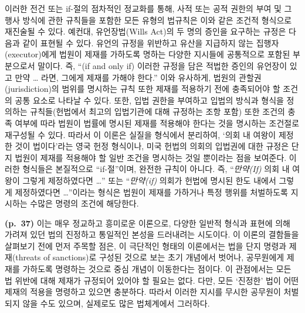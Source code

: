 \documentclass[12pt, oneside]{book}  %
\begin{document}
이러한 전건 또는 if-절의 점차적인 정교화를 통해, 사적 또는 공적 권한의
부여 및 그 행사 방식에 관한 규칙들을 포함한 모든 유형의 법규칙은 이와
같은 조건적 형식으로 재진술될 수 있다. 예컨대, 유언장법(Wills Act)의 두
명의 증인을 요구하는 규정은 다음과 같이 표현될 수 있다. 유언의 규정을
위반하고 유산을 지급하지 않는 집행자(executor)에게 법원이 제재를
가하도록 명하는 다양한 지시들에 공통적으로 포함된 부분으로서 말이다. 즉,
``(if and only if) 이러한 규정을 담은 적법한 증인의 유언장이 있고 만약
\ldots{} 라면, 그에게 제재를 가해야 한다.'' 이와 유사하게, 법원의
관할권(jurisdiction)의 범위를 명시하는 규칙 또한 제재를 적용하기 전에
충족되어야 할 조건의 공통 요소로 나타날 수 있다. 또한, 입법 권한을
부여하고 입법의 방식과 형식을 정의하는 규칙들(헌법에서 최고의 입법기관에
대해 규정하는 조항 포함) 또한 조건의 충족 여부에 따라 법원이 법률에
명시된 제재를 적용해야 한다는 것을 명시하는 조건절로 재구성될 수 있다.
따라서 이 이론은 실질을 형식에서 분리하여, `의회 내 여왕이 제정한 것이
법이다'라는 영국 헌정 형식이나, 미국 헌법의 의회의 입법권에 대한 규정은
단지 법원이 제재를 적용해야 할 일반 조건을 명시하는 것일 뿐이라는 점을
보여준다. 이러한 형식들은 본질적으로 ``if-절''이며, 완전한 규칙이
아니다. 즉, ``\emph{만약(If)} 의회 내 여왕이 그렇게 제정하였다면
\ldots{}'' 또는 ``\emph{만약(if)} 의회가 헌법에 명시된 한도 내에서
그렇게 제정하였다면 \ldots{}''이라는 형식은 법원이 제재를 가하거나 특정
행위를 처벌하도록 지시하는 수많은 명령의 조건에 해당한다.

\textbf{(p.~37)} 이는 매우 정교하고 흥미로운 이론으로, 다양한 일반적
형식과 표현에 의해 가려져 있던 법의 진정하고 통일적인 본성을 드러내려는
시도이다. 이 이론의 결함들을 살펴보기 전에 먼저 주목할 점은, 이 극단적인
형태의 이론에서는 법을 단지 명령과 제재(threats of sanctions)로 구성된
것으로 보는 초기 개념에서 벗어나, 공무원에게 제재를 가하도록 명령하는
것으로 중심 개념이 이동한다는 점이다. 이 관점에서는 모든 법 위반에 대해
제재가 규정되어 있어야 할 필요는 없다. 다만, 모든 `진정한' 법이 어떤
제재의 적용을 명령하고 있으면 충분하다. 따라서 이러한 지시를 무시한
공무원이 처벌되지 않을 수도 있으며, 실제로도 많은 법체계에서 그러하다.
\end{document}
